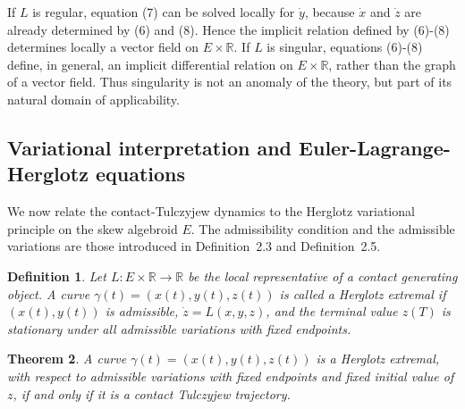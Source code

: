 \documentclass[10pt,a4paper]{amsart}
\newtheorem{theorem}{Theorem}[section]
\newtheorem{definition}[theorem]{Definition}
\begin{document}
If \(L\) is regular, equation (7) can be solved locally for \(\dot y\), because
\(\dot x\) and \(\dot z\) are already determined by (6) and (8). Hence the
implicit relation defined by (6)-(8) determines locally a vector field on
\(E\times\mathbb R\). If \(L\) is singular, equations (6)-(8) define, in general, an implicit
differential relation on \(E\times\mathbb R\), rather than the graph of a vector
field. Thus singularity is not an anomaly of the theory, but part of its natural
domain of applicability.

\subsection{Variational interpretation and Euler-Lagrange-Herglotz equations}
\label{sec:lagrangian}

We now relate the contact-Tulczyjew dynamics to the Herglotz variational
principle on the skew algebroid $E$. The admissibility condition and the
admissible variations are those introduced in Definition~2.3 and
Definition~2.5.

\begin{definition}
Let \(L:E\times\mathbb R\to\mathbb R\) be the local representative of a
contact generating object. A curve $\gamma(t)=(x(t),y(t),z(t))$
is called a Herglotz extremal if \((x(t),y(t))\) is admissible,
$\dot z=L(x,y,z)$, and the terminal value \(z(T)\) is stationary under all admissible
variations with fixed endpoints.
\end{definition}

\begin{theorem}
A curve \(\gamma(t)=(x(t),y(t),z(t))\) is a Herglotz extremal, with respect to
admissible variations with fixed endpoints and fixed initial value of \(z\), if
and only if it is a contact Tulczyjew trajectory.
\end{theorem}
\end{document}
